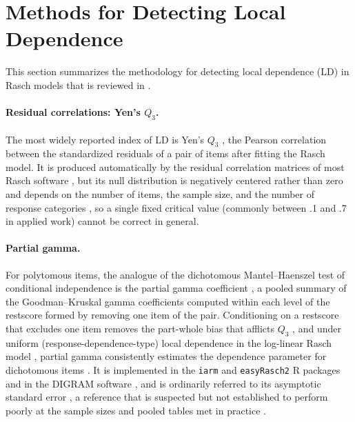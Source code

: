 \documentclass{article}
\begin{document}
\section{Methods for Detecting Local Dependence}

This section summarizes the methodology for detecting local dependence (LD) in Rasch models
that is reviewed in \citet{johansson2026a}.

\paragraph{Residual correlations: Yen's $Q_3$.}
The most widely reported index of LD is Yen's $Q_3$ \citep{yen1984}, the Pearson correlation
between the standardized residuals of a pair of items after fitting the Rasch model. It is
produced automatically by the residual correlation matrices of most Rasch software
\citep[e.g.,][]{linacre2024,andrich2010,chalmers2012,robitzsch2024tam}, but its null distribution
is negatively centered rather than zero and depends on the number of items, the sample size, and
the number of response categories \citep{christensen2017}, so a single fixed critical value
(commonly between .1 and .7 in applied work) cannot be correct in general.

\paragraph{Partial gamma.}
For polytomous items, the analogue of the dichotomous Mantel--Haenszel test of conditional
independence is the partial gamma coefficient \citep{davis1967}, a pooled summary of the
Goodman--Kruskal gamma coefficients \citep{goodmankruskal1954} computed within each level of the
restscore formed by removing one item of the pair. Conditioning on a restscore that excludes one
item removes the part-whole bias that afflicts $Q_3$ \citep{rosenbaum1984}, and under uniform
(response-dependence-type) local dependence in the log-linear Rasch model
\citep{kelderman1984}, partial gamma consistently estimates the dependence parameter for
dichotomous items \citep{kreinerchristensen2004}. It is implemented in the \texttt{iarm}
\citep{muellersantiago2022} and \texttt{easyRasch2} \citep{johansson2026b} R packages and in the
DIGRAM software \citep{kreinernielsen2023}, and is ordinarily referred to its asymptotic standard
error \citep{goodmankruskal1954}, a reference that is suspected but not established to perform
poorly at the sample sizes and pooled tables met in practice \citep{vanderark2015,kreiner1987}.
\end{document}

